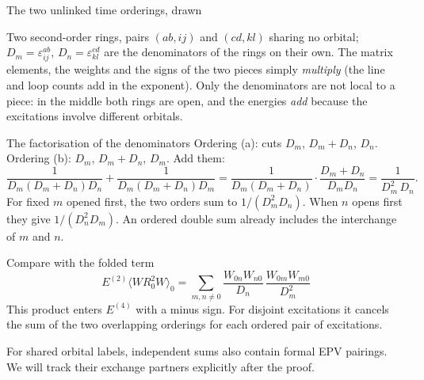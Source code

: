 \documentclass[aspectratio=169,10pt]{beamer}
\newcommand{\av}[1]{\langle #1\rangle_0}
\begin{document}
\begin{frame}{The two unlinked time orderings, drawn}
\begin{center}
\end{center}
\small Two second-order rings, pairs \((ab,ij)\) and \((cd,kl)\) sharing no orbital; \(D_m=\varepsilon_{ij}^{ab}\), \(D_n=\varepsilon_{kl}^{cd}\) are the denominators of the rings on their own. The matrix elements, the weights and the signs of the two pieces simply \emph{multiply} (the line and loop counts add in the exponent). Only the denominators are not local to a piece: in the middle both rings are open, and the energies \emph{add} because the excitations involve different orbitals.
\end{frame}

\begin{frame}{The factorisation of the denominators}
Ordering (a): cuts \(D_m\), \(D_m+D_n\), \(D_n\). Ordering (b): \(D_m\), \(D_m+D_n\), \(D_m\). Add them:
\[
\boxed{\frac{1}{D_m(D_m+D_n)D_n}+\frac{1}{D_m(D_m+D_n)D_m}
=\frac{1}{D_m(D_m+D_n)}\cdot\frac{D_m+D_n}{D_mD_n}
=\frac{1}{D_m^2\,D_n}.}
\]
For fixed $m$ opened first, the two orders sum to $1/(D_m^2D_n)$. When $n$ opens first they give $1/(D_n^2D_m)$. An ordered double sum already includes the interchange of $m$ and $n$.
\begin{block}{Compare with the folded term}
\[
E^{(2)}\av{WR_0^2W}=\sum_{m,n\ne0}\frac{W_{0n}W_{n0}}{D_n}\,\frac{W_{0m}W_{m0}}{D_m^2}
\]
This product enters $E^{(4)}$ with a minus sign. For disjoint excitations it cancels the sum of the two overlapping orderings for each ordered pair of excitations.
\end{block}
For shared orbital labels, independent sums also contain formal EPV pairings. We will track their exchange partners explicitly after the proof.
\end{frame}
\end{document}
